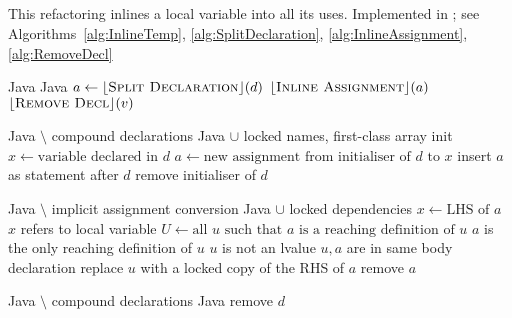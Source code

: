 \subsection{}
This refactoring inlines a local variable into all its uses. Implemented in ; see Algorithms~\ref{alg:InlineTemp}, \ref{alg:SplitDeclaration}, \ref{alg:InlineAssignment}, \ref{alg:RemoveDecl}

\begin{algorithm}
\caption{$\refactoring{Inline Temp}(d : \type{LocalVar})$}
\label{alg:InlineTemp}
\begin{algorithmic}[1]
\REQUIRE Java
\ENSURE Java
\medskip
\STATE $a \leftarrow \lfloor\textsc{Split Declaration}\rfloor(d)$
\STATE $\lfloor\textsc{Inline Assignment}\rfloor(a)$
\STATE $\lfloor\textsc{Remove Decl}\rfloor(v)$
\end{algorithmic}
\end{algorithm}

\begin{algorithm}
\caption{$\refactoring{Split Declaration}(d : \type{LocalVar}) : \option{\type{Assignment}}$}
\label{alg:SplitDeclaration}
\begin{algorithmic}[1]
\REQUIRE Java $\setminus$ compound declarations
\ENSURE Java $\cup$ locked names, first-class array init
\medskip
{}
  \STATE $x \leftarrow \text{variable declared in $d$}$
  \STATE $a \leftarrow \text{new assignment from initialiser of $d$ to $x$}$
  \STATE insert $a$ as statement after $d$
  \STATE remove initialiser of $d$
  \RETURN {}
\ELSE
  \RETURN \None
\ENDIF
\end{algorithmic}
\end{algorithm}

\begin{algorithm}
\caption{$\refactoring{Inline Assignment}(a : \type{Assignment})$}
\label{alg:InlineAssignment}
\begin{algorithmic}[1]
\REQUIRE Java $\setminus$ implicit assignment conversion
\ENSURE Java $\cup$ locked dependencies
\medskip
\STATE $x \leftarrow \text{LHS of $a$}$
\STATE \assert $x$ refers to local variable
\STATE $U \leftarrow \text{all $u$ such that $a$ is a reaching definition of $u$}$
  \STATE \assert $a$ is the only reaching definition of $u$
  \STATE \assert $u$ is not an lvalue
  \STATE \assert $u,a$ are in same body declaration
  \STATE replace $u$ with a locked copy of the RHS of $a$
\ENDFOR
{}
  \STATE remove $a$
\ENDIF
\end{algorithmic}
\end{algorithm}

\begin{algorithm}
\caption{$\refactoring{Remove Decl}(d : \type{LocalVar})$}
\label{alg:RemoveDecl}
\begin{algorithmic}[1]
\REQUIRE Java $\setminus$ compound declarations
\ENSURE Java
\medskip
{}
  \STATE remove $d$
\ENDIF
\end{algorithmic}
\end{algorithm}
